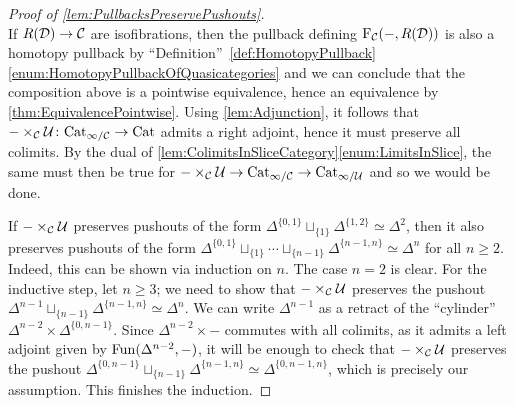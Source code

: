 \begin{proof}[Proof of \cref{lem:PullbacksPreservePushouts}]
\begin{equation*}
	\end{equation*}
	If $R(\mathcal{D})\rightarrow \mathcal{C}$ are isofibrations, then the pullback defining $\operatorname{F}_{\mathcal{C}}(-,R(\mathcal{D}))$ is also a homotopy pullback by \enquote{Definition}~\cref{def:HomotopyPullback}\cref{enum:HomotopyPullbackOfQuasicategories} and we can conclude that the composition above is a pointwise equivalence, hence an equivalence by \cref{thm:EquivalencePointwise}. Using \cref{lem:Adjunction}, it follows that $-\times_{\mathcal{C}}\mathcal{U}\colon \mathrm{Cat}_{\infty/\mathcal{C}}\rightarrow \mathrm{Cat}$ admits a right adjoint, hence it must preserve all colimits. By the dual of \cref{lem:ColimitsInSliceCategory}\cref{enum:LimitsInSlice}, the same must then be true for $-\times_{\mathcal{C}}\mathcal{U}\rightarrow \mathrm{Cat}_{\infty/\mathcal{C}}\rightarrow\mathrm{Cat}_{\infty/\mathcal{U}}$ and so we would be done.
	
	If $-\times_{\mathcal{C}}\mathcal{U}$ preserves pushouts of the form $\Delta^{\{0,1\}}\sqcup_{\{1\}}\Delta^{\{1,2\}}\simeq \Delta^2$, then it also preserves pushouts of the form $\Delta^{\{0,1\}}\sqcup_{\{1\}}\dotsb\sqcup_{\{n-1\}}\Delta^{\{n-1,n\}}\simeq \Delta^n$ for all $n\geqslant 2$. Indeed, this can be shown via induction on $n$. The case $n=2$ is clear. For the inductive step, let $n\geqslant 3$; we need to show that $-\times_{\mathcal{C}}\mathcal{U}$ preserves the pushout $\Delta^{n-1}\sqcup_{\{n-1\}}\Delta^{\{n-1,n\}}\simeq \Delta^n$. We can write $\Delta^{n-1}$ as a retract of the \enquote{cylinder} $\Delta^{n-2}\times \Delta^{\{0,n-1\}}$. Since $\Delta^{n-2}\times-$ commutes with all colimits, as it admits a left adjoint given by $\operatorname{Fun}(\Delta^{n-2},-)$, it will be enough to check that $-\times_{\mathcal{C}}\mathcal{U}$ preserves the pushout $\Delta^{\{0,n-1\}}\sqcup_{\{n-1\}}\Delta^{\{n-1,n\}}\simeq \Delta^{\{0,n-1,n\}}$, which is precisely our assumption. This finishes the induction.
	

\end{proof}
